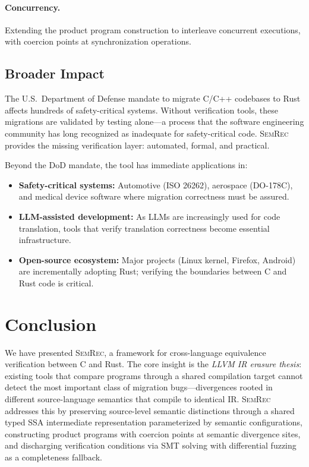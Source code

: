 \documentclass[11pt]{article}
\begin{document}
\paragraph{Concurrency.}
Extending the product program construction to interleave concurrent executions, with coercion points at synchronization operations.

\subsection{Broader Impact}
\label{sec:impact}

The U.S.\ Department of Defense mandate to migrate C/C++ codebases to Rust affects hundreds of safety-critical systems. Without verification tools, these migrations are validated by testing alone---a process that the software engineering community has long recognized as inadequate for safety-critical code. \textsc{SemRec} provides the missing verification layer: automated, formal, and practical.

Beyond the DoD mandate, the tool has immediate applications in:
\begin{itemize}
  \item \textbf{Safety-critical systems:} Automotive (ISO 26262), aerospace (DO-178C), and medical device software where migration correctness must be assured.
  \item \textbf{LLM-assisted development:} As LLMs are increasingly used for code translation, tools that verify translation correctness become essential infrastructure.
  \item \textbf{Open-source ecosystem:} Major projects (Linux kernel, Firefox, Android) are incrementally adopting Rust; verifying the boundaries between C and Rust code is critical.
\end{itemize}


\section{Conclusion}
\label{sec:conclusion}

We have presented \textsc{SemRec}, a framework for cross-language equivalence verification between C and Rust.
The core insight is the \emph{LLVM IR erasure thesis}: existing tools that compare programs through a shared compilation target cannot detect the most important class of migration bugs---divergences rooted in different source-language semantics that compile to identical IR.
\textsc{SemRec} addresses this by preserving source-level semantic distinctions through a shared typed SSA intermediate representation parameterized by semantic configurations, constructing product programs with coercion points at semantic divergence sites, and discharging verification conditions via SMT solving with differential fuzzing as a completeness fallback.
\end{document}
